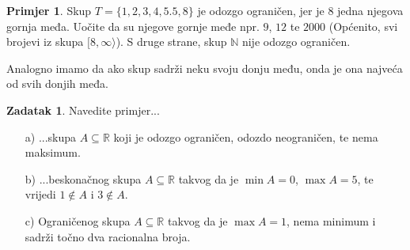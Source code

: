 \documentclass{book}
\theoremstyle{definition}
\theoremstyle{definition}
\newtheorem{exmp}{Primjer}
\newtheorem{exercise}{Zadatak}
\theoremstyle{remark}
\begin{document}
\begin{exmp}
Skup $T=\{1, 2, 3, 4, 5.5, 8\}$ je odozgo ograničen, jer je $8$ jedna njegova gornja međa. Uočite da su njegove gornje međe npr. $9$, $12$ te $2000$ (Općenito, svi brojevi iz skupa $[8,\infty\rangle$). S druge strane, skup $\mathbb{N}$ nije odozgo ograničen. 

Analogno imamo da ako skup sadrži neku svoju donju među, onda je ona najveća od svih donjih međa.
\end{exmp}
\begin{exercise} Navedite primjer...
\begin{itemize}
\item[a)] ...skupa $A\subseteq \mathbb{R}$ koji je odozgo ograničen, odozdo neograničen, te nema maksimum.
\item[b)] ...beskonačnog skupa $A\subseteq \mathbb{R}$ takvog da je $\min{A}=0$, $\max{A}=5$, te vrijedi $1\notin A$ i $3\notin A$.
\item[c)] Ograničenog skupa $A\subseteq \mathbb{R}$ takvog da je $\max{A}=1$, nema minimum i sadrži točno dva racionalna broja.
\end{itemize}
\end{exercise}
\end{document}
